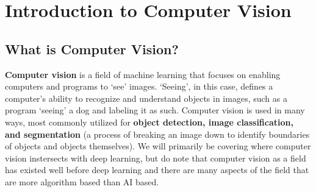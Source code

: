 \section{Introduction to Computer Vision}
\subsection{What is Computer Vision?}
\begin{flushleft}
    \large \textbf{Computer vision} is a field of machine learning that focuses on enabling computers and programs to \lq see' images. \lq Seeing', in this case, defines a computer's ability to recognize and understand objects in images, such as a program \lq seeing' a dog and labeling it as such. Computer vision is used in many ways, most commonly utilized for \textbf{object detection, image classification, and segmentation} (a process of breaking an image down to identify boundaries of objects and objects themselves).  We will primarily be covering where computer vision instersects with deep learning, but do note that computer vision as a field has existed well before deep learning and there are many aspects of the field that are more algorithm based than AI based.
\end{flushleft}

